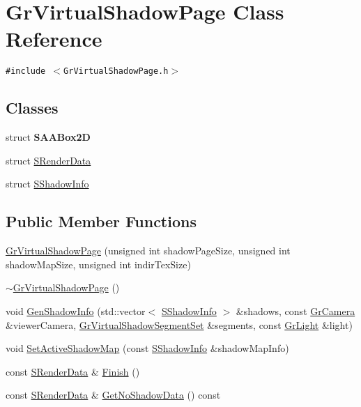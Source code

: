 \hypertarget{class_gr_virtual_shadow_page}{
\section{GrVirtualShadowPage Class Reference}
\label{class_gr_virtual_shadow_page}
}
{\tt \#include $<$GrVirtualShadowPage.h$>$}

\subsection*{Classes}
\begin{CompactItemize}
\item 
struct \textbf{SAABox2D}
\item 
struct \hyperlink{struct_gr_virtual_shadow_page_1_1_s_render_data}{SRenderData}
\item 
struct \hyperlink{struct_gr_virtual_shadow_page_1_1_s_shadow_info}{SShadowInfo}
\end{CompactItemize}
\subsection*{Public Member Functions}
\begin{CompactItemize}
\item 
\hyperlink{class_gr_virtual_shadow_page_10dc766d8a8b6c912b39e60893bdfae8}{GrVirtualShadowPage} (unsigned int shadowPageSize, unsigned int shadowMapSize, unsigned int indirTexSize)
\item 
\hyperlink{class_gr_virtual_shadow_page_6b13a721bc654d712d0159332f668166}{$\sim$GrVirtualShadowPage} ()
\item 
void \hyperlink{class_gr_virtual_shadow_page_47d88b2d5752b7a1e2f38d14d5df538d}{GenShadowInfo} (std::vector$<$ \hyperlink{struct_gr_virtual_shadow_page_1_1_s_shadow_info}{SShadowInfo} $>$ \&shadows, const \hyperlink{class_gr_camera}{GrCamera} \&viewerCamera, \hyperlink{class_gr_virtual_shadow_segment_set}{GrVirtualShadowSegmentSet} \&segments, const \hyperlink{class_gr_light}{GrLight} \&light)
\item 
void \hyperlink{class_gr_virtual_shadow_page_e438a2c1b4140e1c7a12b1c1628d2040}{SetActiveShadowMap} (const \hyperlink{struct_gr_virtual_shadow_page_1_1_s_shadow_info}{SShadowInfo} \&shadowMapInfo)
\item 
const \hyperlink{struct_gr_virtual_shadow_page_1_1_s_render_data}{SRenderData} \& \hyperlink{class_gr_virtual_shadow_page_6fe56d04431ca8c88be756ff92d98e09}{Finish} ()
\item 
const \hyperlink{struct_gr_virtual_shadow_page_1_1_s_render_data}{SRenderData} \& \hyperlink{class_gr_virtual_shadow_page_23f6fa9b0a66272dcc951413faafaf09}{GetNoShadowData} () const 
\end{CompactItemize}


